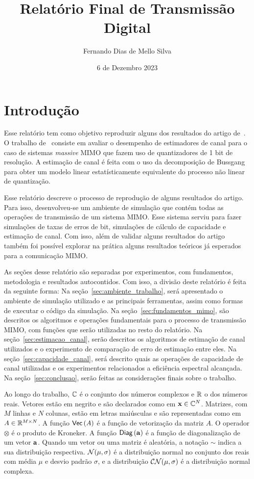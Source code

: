 \documentclass{article}
\title{Relatório Final de Transmissão Digital}
\author{Fernando Dias de Mello Silva}
\date{6 de Dezembro 2023}
\begin{document}
\maketitle

\section{Introdução}

Esse relatório tem como objetivo reproduzir alguns dos resultados do artigo de~\cite{li.etal_2017a}. O trabalho de~\cite{li.etal_2017a} consiste em avaliar o desempenho de estimadores de canal para o caso de sistemas \textit{massive} MIMO que fazem uso de quantizadores de 1 bit de resolução. A estimação de canal é feita com o uso da decomposição de Bussgang para obter um modelo linear estatísticamente equivalente do processo não linear de quantização. 

Esse relatório descreve o processo de reprodução de alguns resultados do artigo. Para isso, desenvolveu-se um ambiente de simulação que contém todas as operações de transmissão de um sistema MIMO. Esse sistema serviu para fazer simulações de taxas de erros de bit, simulações de cálculo de capacidade e estimação de canal. Com isso, além de validar alguns resultados do artigo também foi possível explorar na prática alguns resultados teóricos já esperados para a comunicação MIMO.

As seções desse relatório são separadas por experimentos, com fundamentos, metodologia e resultados autocontidos. Com isso, a divisão deste relatório é feita da seguinte forma:
Na seção~\ref{sec:ambiente_trabalho}, será apresentado o ambiente de simulação utilizado e as principais ferramentas, assim como formas de executar o código da simulação.
Na seção~\ref{sec:fundamentos_mimo}, são descritos os algoritmos e operações fundamentais para o processo de transmissão MIMO, com funções que serão utilizadas no resto do relatório. 
Na seção~\ref{sec:estimacao_canal}, serão descritos os algoritmos de estimação de canal utilizados e o experimento de comparação de erro de estimação entre eles.
Na seção~\ref{sec:capacidade_canal}, será descrito quais as operações de capacidade de canal utilizadas e os experimentos relacionados a eficiência espectral alcançada.
Na seção~\ref{sec:conclusao}, serão feitas as considerações finais sobre o trabalho.

Ao longo do trabalho, $\mathbb{C}$ é o conjunto dos números complexos e $\mathbb{R}$ o dos números reais. Vetores estão em negrito e são declarados como em $\mathbf{x}\in\mathbb{C}^{N}$. Matrizes, com $M$ linhas e $N$ colunas, estão em letras maiúsculas e são representadas como em $A\in\mathbb{R}^{M\times N}$. A função $ \mathsf{Vec} \left( A \right) $ é a função de vetorização da matriz $A$. O operador $\otimes$ é o produto de Kroneker. A função $ \mathsf{Diag} \left( \mathbf{a} \right) $ é a função de diagonalização de um vetor $\mathbf{a}$.  Quando um vetor ou uma matriz é aleatória, a notação $\sim$ indica a sua distribuição respectiva. $\mathcal{N}(\mu,\sigma)$ é a distribuição normal no conjunto dos reais com média $\mu$ e desvio padrão $\sigma$, e a distribuição $\mathcal{C}\mathcal{N}(\mu,\sigma)$ é a distribuição normal complexa. 
\end{document}
